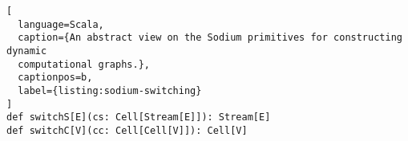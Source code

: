 \begin{lstlisting}[
  language=Scala,
  caption={An abstract view on the Sodium primitives for constructing dynamic
  computational graphs.},
  captionpos=b,
  label={listing:sodium-switching}
]
def switchS[E](cs: Cell[Stream[E]]): Stream[E]
def switchC[V](cc: Cell[Cell[V]]): Cell[V]
\end{lstlisting}
